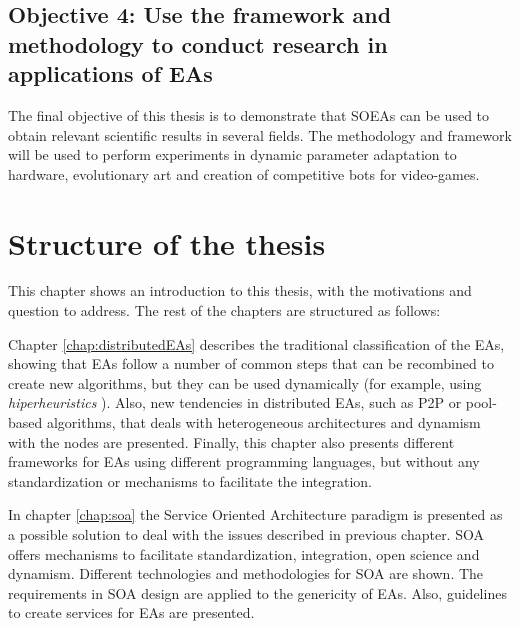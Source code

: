 \subsection*{Objective 4: Use the framework and methodology to conduct research in applications of EAs}
\label{subsec:intro:obj:applications}
The final objective of this thesis is to demonstrate that SOEAs can be used to obtain relevant scientific results in several fields. The methodology and framework will be used to perform experiments in dynamic parameter adaptation to hardware, evolutionary art and creation of competitive bots for video-games.



\section{Structure of the thesis}
\label{sec:intro:structure}

This chapter shows an introduction to this thesis, with the
motivations and question to address. %
The rest of the chapters are structured as follows:

Chapter \ref{chap:distributedEAs} describes the traditional classification of the EAs, showing that EAs follow a number of common steps that can be recombined to create new algorithms, but they can be used dynamically (for example, using {\em hiperheuristics} \cite{cowling2001hyperheuristic}). Also, new tendencies in distributed EAs, such as P2P or pool-based algorithms, that deals with heterogeneous architectures and dynamism with the nodes are presented. Finally, this chapter also presents different frameworks for EAs using different programming languages, but without any standardization or mechanisms to facilitate the integration.

In chapter \ref{chap:soa} the Service Oriented Architecture paradigm is presented as a possible solution to deal with the issues described in previous chapter. SOA  offers mechanisms to facilitate standardization, integration, open science and dynamism. Different technologies and methodologies for SOA are shown. The requirements in SOA design are applied to the genericity of EAs. Also, guidelines to create services for EAs are presented.

